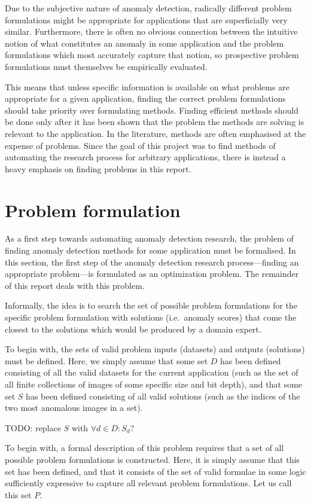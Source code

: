 Due to the subjective nature of anomaly detection, radically different problem formulations might be appropriate for applications that are superficially very similar. Furthermore, there is often no obvious connection between the intuitive notion of what constitutes an anomaly in some application and the problem formulations which most accurately capture that notion, so prospective problem formulations must themselves be empirically evaluated.

This means that unless specific information is available on what problems are appropriate for a given application, finding the correct problem formulations should take priority over formulating methods. Finding efficient methods should be done only after it has been shown that the problem the methods are solving is relevant to the application. In the literature, methods are often emphasised at the expense of problems. Since the goal of this project was to find methods of automating the research process for arbitrary applications, there is instead a heavy emphasis on finding problems in this report. 

\section{Problem formulation}
As a first step towards automating anomaly detection research, the problem of finding anomaly detection methods for some application must be formalised. In this section, the first step of the anomaly detection research process---finding an appropriate problem---is formulated as an optimization problem. The remainder of this report deals with this problem.

Informally, the idea is to search the set of possible problem formulations for the specific problem formulation with solutions (i.e.\ anomaly scores) that come the closest to the solutions which would be produced by a domain expert.

To begin with, the sets of valid problem inputs (datasets) and outputs (solutions) must be defined. Here, we simply assume that some set $D$ has been defined consisting of all the valid datasets for the current application (such as the set of all finite collections of images of some specific size and bit depth), and that some set $S$ has been defined consisting of all valid solutions (such as the indices of the two most anomalous images in a set).

TODO: replace $S$ with $\forall d \in D: S_d$?

To begin with, a formal description of this problem requires that a set of all possible problem formulations is constructed. Here, it is simply assume that this set has been defined, and that it consists of the set of valid formulae in some logic sufficiently expressive to capture all relevant problem formulations. Let us call this set $P$.


